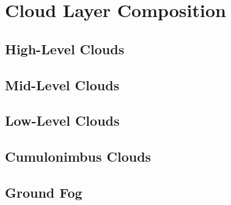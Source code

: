 \section{Cloud Layer Composition}
\label{section:layers}

\subsection{High-Level Clouds}
\label{section:layers:1}

\subsection{Mid-Level Clouds}
\label{section:layers:2}

\subsection{Low-Level Clouds}
\label{section:layers:3}

\subsection{Cumulonimbus Clouds}
\label{section:layers:4}

\subsection{Ground Fog}
\label{section:layers:5}